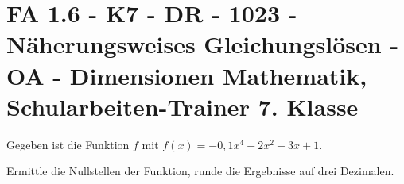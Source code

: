 \section{FA 1.6 - K7 - DR - 1023 - Näherungsweises Gleichungslösen - OA - Dimensionen Mathematik, Schularbeiten-Trainer 7. Klasse}

\begin{beispiel}[K7 - DR]{1} %
Gegeben ist die Funktion $f$ mit $f(x)=-0,1x^4+2x^2-3x+1$.

Ermittle die Nullstellen der Funktion, runde die Ergebnisse auf drei Dezimalen.\leer

				
				\end{beispiel}